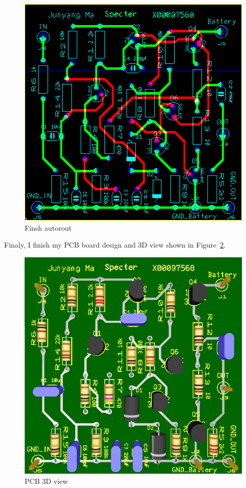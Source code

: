 \begin{figure}[htbp]
	\centering
	\includegraphics[scale=0.9]{"../Photo/Chap6/final PCB all"}
	\caption{Finsh autorout }
	\label{fig:Finsh autorout}
\end{figure}

Finaly, I finish my PCB board design and 3D view shown in Figure~\ref{fig:PCB 3D view}.

\begin{figure}[htbp]
	\centering
	\includegraphics[scale=0.6]{"../Photo/Chap6/final PCB 3D view"}
	\caption{PCB 3D view }
	\label{fig:PCB 3D view}
\end{figure}
